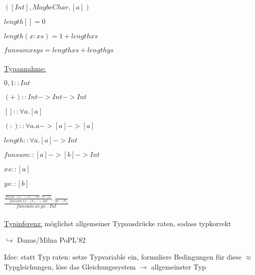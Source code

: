\documentclass[12pt]{article}
\author{Bennet Bleßmann}
\begin{document}
$([Int], Maybe Char, [a])$



$length [] = 0$

$length (x:xs) = 1 + length xs$

$funsum xs ys = length xs + length ys$

\paragraph{}

\underline{Typannahme:}

$0,1::Int$

$(+)::Int->Int->Int$

$[] :: \forall a.[a]$

$(:) :: \forall a. a->[a]->[a]$

$length::\forall a.[a]->Int$

$funsum::[a]->[b]->Int$

$xs::[a]$

$ys::[b]$

$\frac{\frac{\frac{}{funsum::[a]->[b]->Int},\frac{}{xs::[a]}}{funsum\, xs ::[b] -> Int},\frac{}{ys :: [b]}}{funsum\, xs\, ys :: Int}$

\paragraph{}

\underline{Typinferenz:} möglichst allgemeiner Typausdrücke raten, sodass typkorrekt

$\hookrightarrow$ Danas/Milna PoPL'82

Idee: statt Typ raten: setze Typvariable ein, formuliere Bedingungen für diese $\approx$ Typgleichungen, löse das Gleichungssystem $\rightarrow$ allgemeinster Typ
\end{document}
